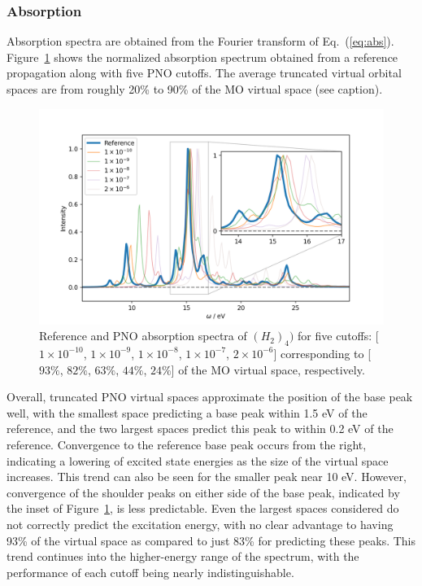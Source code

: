 \subsubsection{Absorption} \label{sss:abs}
Absorption spectra are obtained from the Fourier transform of Eq.~(\ref{eq:abs}).
Figure~\ref{fig:pno_abs} shows the normalized absorption spectrum obtained from
a reference propagation along with five PNO cutoffs. The average truncated virtual 
orbital spaces are from roughly 20\% to 90\% of the MO virtual space (see caption). 
\begin{figure} 
    \centering
    \includegraphics[scale=.6]{p3/figures/pno_abs.png}
    \caption{Reference and PNO absorption spectra of $(H_2)_4)$ for five cutoffs: 
    [$1\times 10^{-10}$, $1\times 10^{-9}$, $1\times 10^{-8}$, $1\times 10^{-7}$, 
    $2\times 10^{-6}$] corresponding to [$93\%$, $82\%$, $63\%$, $44\%$, $24\%$]
    of the MO virtual space, respectively.}
    \label{fig:pno_abs}
\end{figure}
Overall, truncated PNO virtual spaces approximate the position of the base peak well,
with the smallest space predicting a base peak within 1.5 eV of the reference,
and the two largest spaces predict this peak to within 0.2 eV of the reference.
Convergence to the reference base peak occurs from the right, indicating
a lowering of excited state energies as the size of the virtual space increases. 
This trend can also be seen for the smaller peak near 10 eV. However, convergence of the shoulder 
peaks on either side of the base peak, indicated by the inset of 
Figure~\ref{fig:pno_abs}, is less predictable. Even the largest spaces considered
do not correctly predict the excitation energy, with no clear advantage to having
93\% of the virtual space as compared to just 83\% for predicting these peaks.
This trend continues into the higher-energy range of the spectrum, with the 
performance of each cutoff being nearly indistinguishable. 

